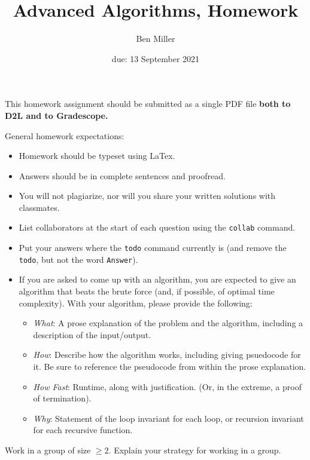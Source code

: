 \documentclass{article}
\title{Advanced Algorithms, Homework \hwnum}
\author{Ben Miller}
\date{due: 13 September 2021}
\begin{document}
\maketitle

This homework assignment should be
submitted as a single PDF file {\bf both to D2L and to Gradescope.}

General homework expectations:
\begin{itemize}
	\item Homework should be typeset using LaTex.
	\item Answers should be in complete sentences and proofread.
	\item You will not plagiarize, nor will you share your written solutions
	      with classmates.
	\item List collaborators at the start of each question using the
	      \texttt{collab} command.
	\item Put your answers where the \texttt{todo} command currently is (and
	      remove the \texttt{todo}, but not the word \texttt{Answer}).
	\item If you are asked to come up with an algorithm, you are
	      expected to give an algorithm that beats the brute force (and, if possible, of
	      optimal time complexity). With your algorithm, please provide the following:
	      \begin{itemize}
		      \item \emph{What}: A prose explanation of the problem and the algorithm,
		            including a description of the input/output.
		      \item \emph{How}: Describe how the algorithm works, including giving
		            psuedocode for it.  Be sure to reference the pseudocode
		            from within the prose explanation.
		      \item \emph{How Fast}: Runtime, along with justification.  (Or, in the
		            extreme, a proof of termination).
		      \item \emph{Why}: Statement of the loop invariant for each loop, or
		            recursion invariant for each recursive function.
	      \end{itemize}
\end{itemize}




Work in a group of size $\geq 2$.  Explain your strategy for working in a group.
\end{document}
